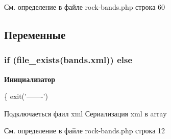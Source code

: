 См. определение в файле rock-\/bands.\+php строка 60



\subsection{Переменные}
\subsubsection[{\texorpdfstring{else}{else}}]{\setlength{\rightskip}{0pt plus 5cm}if (file\+\_\+exists(\textquotesingle{}bands.\+xml\textquotesingle{})) else}\hypertarget{rock-bands_8php_a10fc9dda0e4ffe9e7c1e5204da454f07}{}\label{rock-bands_8php_a10fc9dda0e4ffe9e7c1e5204da454f07}
{\bfseries Инициализатор}
\begin{DoxyCode}
\{
exit(\textcolor{stringliteral}{'-------'})
\end{DoxyCode}
Подключаеться фаил xml Сериализация xml в array 

См. определение в файле rock-\/bands.\+php строка 12


